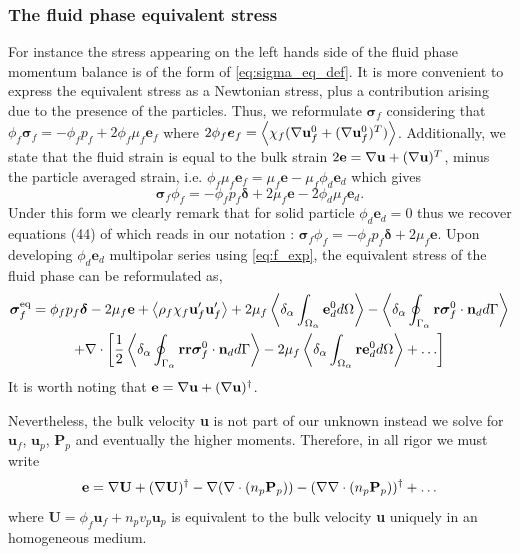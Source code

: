 \subsubsection{The fluid phase equivalent stress}
For instance the stress appearing on the left hands side of the fluid phase momentum balance is of the form of \ref{eq:sigma_eq_def}. 
It is more convenient to express the equivalent stress as a Newtonian stress, plus a contribution arising due to the presence of the particles. 
Thus, we reformulate $\bm{\sigma}_f$ considering that $\phi_f \bm{\sigma}_f = - \phi_f p_f + 2 \phi_f \mu_f \textbf{e}_f$ where $2 \phi_f \bm{e}_f = \left<\chi_f  (\mathbf{\nabla} \textbf{u}_f^0 + (\mathbf{\nabla} \textbf{u}_f^0)^T)\right>$. 
Additionally, we state that the fluid strain is equal to the bulk strain $2\textbf{e} = \mathbf{\nabla} \textbf{u}+ (\mathbf{\nabla} \textbf{u})^T$, minus the particle averaged strain, i.e. $\phi_f \mu_f \textbf{e}_f = \mu_f\textbf{e} - \mu_f \phi_d \textbf{e}_d$ which gives
\begin{equation*}
    \bm\sigma_f\phi_f =-\phi_f p_f \bm\delta + 2 \mu_f \textbf{e} -2\phi_d \mu_f \textbf{e}_d.
    \label{eq:def_sigma_f}
\end{equation*}
Under this form we clearly remark that for solid particle $\phi_d \textbf{e}_d = 0$ thus we recover equations (44) of \citet{jackson1997locally} which reads in our notation : $\bm\sigma_f\phi_f =-\phi_f p_f \bm\delta + 2 \mu_f \textbf{e}$. 
Upon developing $\phi_d \textbf{e}_d$ multipolar series using \ref{eq:f_exp}, the equivalent stress of the fluid phase can be reformulated as, 
\begin{multline}
    \bm{\sigma}^\text{eq}_f = 
    \phi_f p_f \bm\delta 
    - 2\mu_f \textbf{e} 
    +\left<\rho_f\chi_f\textbf{u}_f'\textbf{u}_f'\right> 
    + 2 \mu_f \left<\delta_\alpha \int_{\Omega_{\alpha}} \textbf{e}_d^0 d\Omega\right>
    - \left<\delta_\alpha \oint_{\Gamma_{\alpha}} \textbf{r}\bm{\sigma}_f^0\cdot \textbf{n}_d d\Gamma\right>
    \\
    + \mathbf{\nabla}\cdot \left[
        \frac{1}{2} \left<\delta_\alpha \oint_{\Gamma_{\alpha}} \textbf{rr}\bm{\sigma}_f^0\cdot \textbf{n}_d d\Gamma\right>
        - 2 \mu_f\left<\delta_\alpha \int_{\Omega_{\alpha}}  \textbf{re}_d^0  d\Omega\right>
        + \ldots
    \right]
    \label{eq:sigma_eq_0}
\end{multline} 
It is worth noting that $\textbf{e} = \mathbf{\nabla} \textbf{u} + (\mathbf{\nabla} \textbf{u})^\dagger$. 

Nevertheless, the bulk velocity \textbf{u} is not part of our unknown instead we solve for $\textbf{u}_f$, $\textbf{u}_p$, $\textbf{P}_p$ and eventually the higher moments. 
Therefore, in all rigor we must write 
\begin{equation}
    \textbf{e}
    = 
    \mathbf{\nabla} \textbf{U} + (\mathbf{\nabla} \textbf{U})^\dagger
    - \mathbf{\nabla} (\mathbf{\nabla}\cdot (n_p \textbf{P}_p))
    - (\mathbf{\nabla} \mathbf{\nabla}\cdot (n_p \textbf{P}_p))^\dagger
    + \ldots
    \label{eq:rate_of_strain}
\end{equation}
where $\textbf{U} = \phi_f \textbf{u}_f + n_p v_p \textbf{u}_p$ is equivalent to the bulk velocity \textbf{u} uniquely in an homogeneous medium. 

